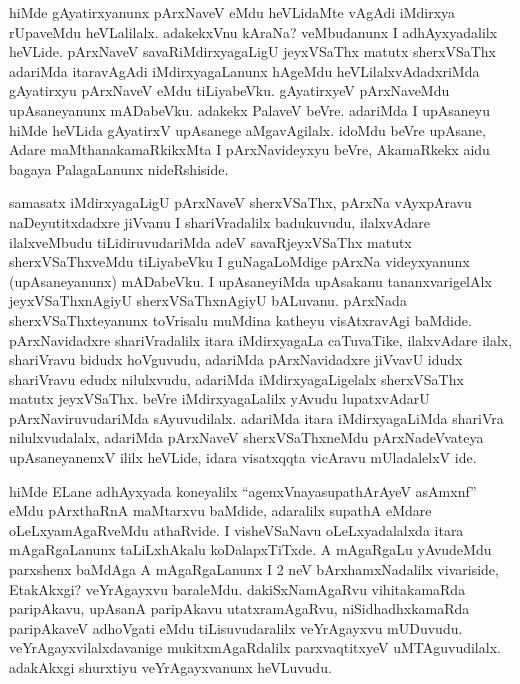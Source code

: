 

\begin{artha}
hiMde gAyatirxyanunx pArxNaveV eMdu heVLidaMte vAgAdi iMdirxya rUpaveMdu heVLalilalx. adakekxVnu kAraNa? veMbudanunx I adhAyxyadalilx heVLide. pArxNaveV savaRiMdirxyagaLigU jeyxVSaThx matutx sherxVSaThx adariMda itaravAgAdi iMdirxyagaLanunx hAgeMdu heVLilalxvAdadxriMda gAyatirxyu pArxNaveV eMdu tiLiyabeVku. gAyatirxyeV pArxNaveMdu upAsaneyanunx mADabeVku. adakekx PalaveV beVre. adariMda I upAsaneyu hiMde heVLida gAyatirxV upAsanege aMgavAgilalx. idoMdu beVre upAsane, Adare maMthanakamaRkikxMta I pArxNavideyxyu beVre, AkamaRkekx aidu bagaya PalagaLanunx nideRshiside.
\end{artha}

\begin{artha}
samasatx iMdirxyagaLigU pArxNaveV sherxVSaThx, pArxNa vAyxpAravu naDeyutitxdadxre jiVvanu I shariVradalilx badukuvudu, ilalxvAdare ilalxveMbudu tiLidiruvudariMda adeV savaRjeyxVSaThx matutx sherxVSaThxveMdu tiLiyabeVku I guNagaLoMdige pArxNa videyxyanunx (upAsaneyanunx) mADabeVku. I upAsaneyiMda upAsakanu tananxvarigelAlx jeyxVSaThxnAgiyU sherxVSaThxnAgiyU bALuvanu. pArxNada sherxVSaThxteyanunx toVrisalu muMdina katheyu visAtxravAgi baMdide. pArxNavidadxre shariVradalilx itara iMdirxyagaLa caTuvaTike, ilalxvAdare ilalx, shariVravu bidudx hoVguvudu, adariMda pArxNavidadxre jiVvavU idudx shariVravu edudx nilulxvudu, adariMda iMdirxyagaLigelalx sherxVSaThx matutx jeyxVSaThx. beVre iMdirxyagaLalilx yAvudu lupatxvAdarU pArxNaviruvudariMda sAyuvudilalx. adariMda itara iMdirxyagaLiMda shariVra nilulxvudalalx, adariMda pArxNaveV sherxVSaThxneMdu pArxNadeVvateya upAsaneyanenxV ililx heVLide, idara visatxqqta vicAravu mUladalelxV ide.
\end{artha}


\begin{artha}
hiMde ELane adhAyxyada koneyalilx ``agenxVnayasupathArAyeV asAmxnf'' eMdu pArxthaRnA maMtarxvu baMdide, adaralilx supathA eMdare oLeLxyamAgaRveMdu athaRvide. I visheVSaNavu oLeLxyadalalxda itara mAgaRgaLanunx taLiLxhAkalu koDalapxTiTxde. A mAgaRgaLu yAvudeMdu parxshenx baMdAga A mAgaRgaLanunx I 2 neV bArxhamxNadalilx vivariside, EtakAkxgi? veYrAgayxvu baraleMdu. dakiSxNamAgaRvu vihitakamaRda paripAkavu, upAsanA paripAkavu utatxramAgaRvu, niSidhadhxkamaRda paripAkaveV adhoVgati eMdu tiLisuvudaralilx veYrAgayxvu mUDuvudu. veYrAgayxvilalxdavanige mukitxmAgaRdalilx parxvaqtitxyeV uMTAguvudilalx. adakAkxgi shurxtiyu veYrAgayxvanunx heVLuvudu.
\end{artha}

